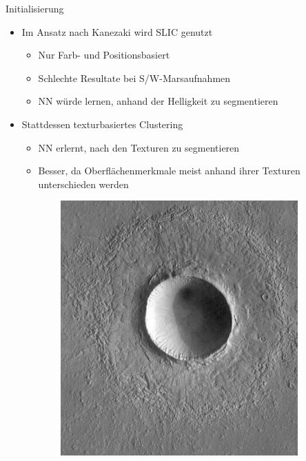 \documentclass{beamer}
\begin{document}
\begin{frame}{Initialisierung}
	\begin{minipage}{0.65\textwidth}
		\begin{itemize}
			\item Im Ansatz nach Kanezaki wird SLIC genutzt
			\begin{itemize}
				\item Nur Farb- und Positionsbasiert
				\item Schlechte Resultate bei S/W-Marsaufnahmen
				\item NN würde lernen, anhand der Helligkeit zu segmentieren
			\end{itemize}
			\item Stattdessen texturbasiertes Clustering
			\begin{itemize}
				\item NN erlernt, nach den Texturen zu segmentieren
				\item Besser, da Oberflächenmerkmale meist anhand ihrer Texturen unterschieden werden
			\end{itemize}
		\end{itemize}
	\end{minipage}
	\hfill
	\begin{minipage}{0.20\textwidth}
		\begin{figure}[h!]
			\begin{subfigure}{\textwidth}
				\includegraphics[width=\textwidth,keepaspectratio]{gfx/Gre13_01.jpg}

\end{subfigure}
\end{figure}
\end{minipage}
\end{frame}
\end{document}
